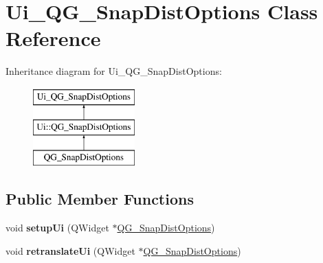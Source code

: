 \hypertarget{classUi__QG__SnapDistOptions}{\section{Ui\-\_\-\-Q\-G\-\_\-\-Snap\-Dist\-Options Class Reference}
\label{classUi__QG__SnapDistOptions}
}
Inheritance diagram for Ui\-\_\-\-Q\-G\-\_\-\-Snap\-Dist\-Options\-:\begin{figure}[H]
\begin{center}
\leavevmode
\includegraphics[height=3.000000cm]{classUi__QG__SnapDistOptions}
\end{center}
\end{figure}
\subsection*{Public Member Functions}
\begin{DoxyCompactItemize}
\item 
\hypertarget{classUi__QG__SnapDistOptions_a6f5168894a5bd6e7369971e453042fc9}{void {\bfseries setup\-Ui} (Q\-Widget $\ast$\hyperlink{classQG__SnapDistOptions}{Q\-G\-\_\-\-Snap\-Dist\-Options})}\label{classUi__QG__SnapDistOptions_a6f5168894a5bd6e7369971e453042fc9}

\item 
\hypertarget{classUi__QG__SnapDistOptions_a665c239644213df6025ff842b6f7801f}{void {\bfseries retranslate\-Ui} (Q\-Widget $\ast$\hyperlink{classQG__SnapDistOptions}{Q\-G\-\_\-\-Snap\-Dist\-Options})}\label{classUi__QG__SnapDistOptions_a665c239644213df6025ff842b6f7801f}

\end{DoxyCompactItemize}
